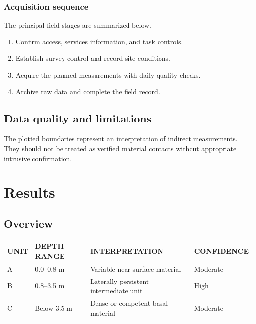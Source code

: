 \documentclass{erp-report}
\begin{document}
\subsection{Acquisition sequence}
The principal field stages are summarized below.
\begin{enumerate}
  \item Confirm access, services information, and task controls.
  \item Establish survey control and record site conditions.
  \item Acquire the planned measurements with daily quality checks.
  \item Archive raw data and complete the field record.
\end{enumerate}

\section{Data quality and limitations}
\lipsum[8]

\begin{reportwarning}
  The plotted boundaries represent an interpretation of indirect
  measurements. They should not be treated as verified material contacts
  without appropriate intrusive confirmation.
\end{reportwarning}

\chapter{Results}

\section{Overview}
\lipsum[9]

\begin{reporttable}
  \caption{Illustrative summary of interpreted subsurface units.}
  \label{tab:units}
  \begin{tabularx}{\textwidth}{@{}p{24mm}p{32mm}X p{25mm}@{}}
    \toprule
    \textcolor{ERPTopSoil}{\MakeUppercase{Unit}} &
    \textcolor{ERPTopSoil}{\MakeUppercase{Depth range}} &
    \textcolor{ERPTopSoil}{\MakeUppercase{Interpretation}} &
    \textcolor{ERPTopSoil}{\MakeUppercase{Confidence}} \\
    \midrule
    A & 0.0--0.8 m & Variable near-surface material & Moderate \\
    B & 0.8--3.5 m & Laterally persistent intermediate unit & High \\
    C & Below 3.5 m & Dense or competent basal material & Moderate \\
    \bottomrule
  \end{tabularx}
\end{reporttable}
\end{document}

